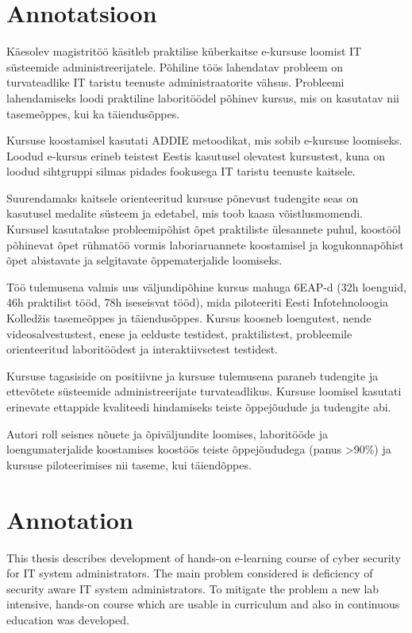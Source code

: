\clearpage
\chapter*{Annotatsioon}
\label{annotatsioon}
\thispagestyle{empty}

Käesolev magistritöö käsitleb praktilise küberkaitse e-kursuse loomist IT süsteemide administreerijatele. Põhiline töös lahendatav probleem on turvateadlike IT taristu teenuste administraatorite vähsus. Probleemi lahendamiseks loodi praktiline laboritöödel põhinev kursus, mis on kasutatav nii tasemeõppes, kui ka täiendusõppes.

Kursuse koostamisel kasutati \gls{ADDIE} metoodikat, mis sobib e-kursuse loomiseks. Loodud e-kursus erineb teistest Eestis kasutusel olevatest kursustest, kuna on loodud sihtgruppi silmas pidades fookusega IT taristu teenuste kaitsele.

Suurendamaks kaitsele orienteeritud kursuse põnevust tudengite seas on kasutusel medalite süsteem ja edetabel, mis toob kaasa võistlusmomendi. Kursusel kasutatakse probleemipõhist õpet praktiliste ülesannete puhul, koostööl põhinevat õpet rühmatöö vormis laboriaruannete  koostamisel ja kogukonnapõhist õpet abistavate ja selgitavate õppematerjalide loomiseks.

Töö tulemusena valmis uus väljundipõhine kursus mahuga 6EAP-d (32h loenguid, 46h praktilist tööd, 78h iseseisvat tööd), mida piloteeriti Eesti Infotehnoloogia Kolledžis tasemeõppes ja täiendusõppes. Kursus koosneb loengutest, nende videosalvestustest, enese ja eelduste testidest, praktilistest, probleemile orienteeritud laboritöödest ja interaktiivsetest testidest.

Kursuse tagasiside on positiivne ja kursuse tulemusena paraneb tudengite ja ettevõtete süsteemide administreerijate turvateadlikus. Kursuse loomisel kasutati erinevate ettappide kvaliteedi hindamiseks teiste õppejõudude ja tudengite abi.

Autori roll seisnes nõuete ja õpiväljundite loomises, laboritööde ja loengumaterjalide koostamises koostöös teiste õppejõududega (panus >90\%) ja kursuse piloteerimises nii taseme, kui täiendõppes.

\clearpage
\chapter*{Annotation}
\label{annotation}
\thispagestyle{empty}

This thesis describes development of hands-on e-learning course of cyber security for IT system administrators. The main problem considered is deficiency of security aware IT system administrators. To mitigate the problem a new lab intensive, hands-on course which are usable in curriculum and also in continuous education was developed.

